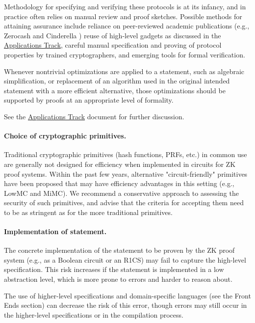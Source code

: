 Methodology for specifying and verifying these protocols is at its infancy, and in practice often relies on manual review and proof sketches. 
Possible methods for attaining assurance include reliance on peer-reviewed academic publications 
(e.g., Zerocash \cite{2014:SP:Zerocash} %
and Cinderella \cite{2016:SP:cinderella}) %
reuse of high-level gadgets as discussed in the \hyperref[chap:track-apps]{Applications Track}, careful manual specification and proving of protocol properties by trained cryptographers, and emerging tools for formal verification.

Whenever nontrivial optimizations are applied to a statement, such as algebraic simplification, or replacement of an algorithm used in the original intended statement with a more efficient alternative, those optimizations should be supported by proofs at an appropriate level of formality.

See the \hyperref[chap:track-apps]{Applications Track} document for further discussion.


\paragraph{Choice of cryptographic primitives.}

Traditional cryptographic primitives (hash functions, PRFs, etc.) in common use are generally not designed for efficiency when implemented in circuits for ZK proof systems. Within the past few years, alternative "circuit-friendly" primitives have been proposed that may have efficiency advantages in this setting (e.g., LowMC and MiMC). We recommend a conservative approach to assessing the security of such primitives, and advise that the criteria for accepting them need to be as stringent as for the more traditional primitives.


\paragraph{Implementation of statement.}

The concrete implementation of the statement to be proven by the ZK proof system (e.g., as a Boolean circuit or an R1CS) may fail to capture the high-level specification. This risk increases if the statement is implemented in a low abstraction level, which is more prone to errors and harder to reason about.

The use of higher-level specifications and domain-specific languages (see the Front Ends section) can decrease the risk of this error, though errors may still occur in the higher-level specifications or in the compilation process.

